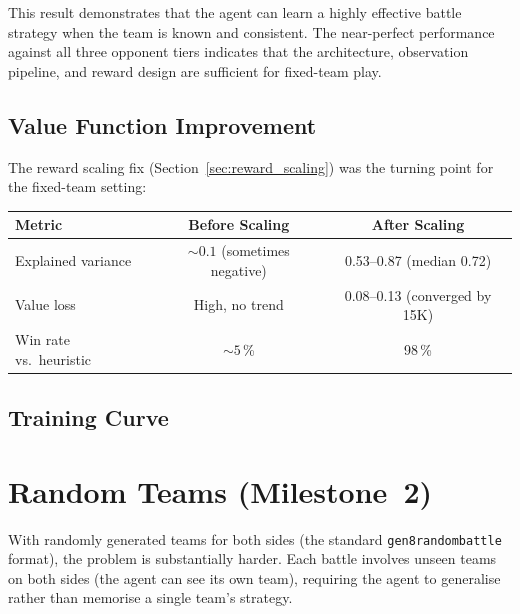 This result demonstrates that the agent can learn a highly effective battle
strategy when the team is known and consistent.  The near-perfect performance
against all three opponent tiers indicates that the architecture, observation
pipeline, and reward design are sufficient for fixed-team play.

\subsection{Value Function Improvement}

The reward scaling fix (Section~\ref{sec:reward_scaling}) was the turning
point for the fixed-team setting:

\begin{center}
\small
\begin{tabularx}{\textwidth}{l c c}
  \toprule
  \textbf{Metric} & \textbf{Before Scaling} & \textbf{After Scaling} \\
  \midrule
  Explained variance & ${\sim}0.1$ (sometimes negative) & 0.53--0.87 (median 0.72) \\
  Value loss         & High, no trend                     & 0.08--0.13 (converged by 15K) \\
  Win rate vs.\ heuristic & ${\sim}5$\,\%               & 98\,\% \\
  \bottomrule
\end{tabularx}
\end{center}


\subsection{Training Curve}


\section{Random Teams (Milestone~2)}

With randomly generated teams for both sides (the standard
\texttt{gen8randombattle} format), the problem is substantially harder.  Each
battle involves unseen teams on both sides (the agent can see its own team),
requiring the agent to generalise rather than memorise a single team's
strategy.

